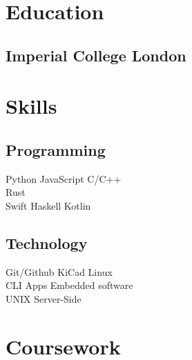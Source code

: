 \documentclass[]{deedy-resume-reversed}
\begin{document}
\hfill
\begin{minipage}[t]{0.33\textwidth}


	\section{Education}

	\subsection{Imperial College London}
	\sectionsep


	\section{Skills}
	\subsection{Programming}
	Python \textbullet{} JavaScript \textbullet{} C/C++ \\
	Rust \\
	Swift \textbullet{} Haskell \textbullet{} Kotlin \\
	\sectionsep

	\subsection{Technology}
	Git/Github \textbullet{} KiCad \textbullet{} Linux \\
	CLI Apps \textbullet{} Embedded software \\
	UNIX \textbullet{} Server-Side \\
	\sectionsep


	\section{Coursework}


\end{minipage}
\end{document}
